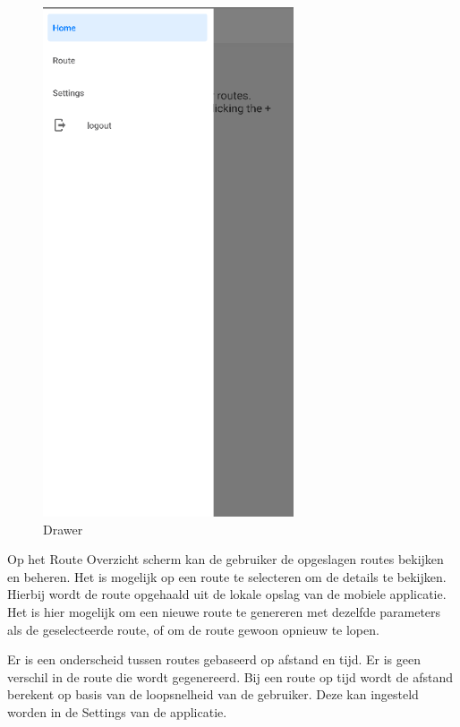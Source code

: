     \begin{figure}[htbp]
        \includegraphics[width=20em]{./graphics/drawer.png}
        \centering
        \caption{Drawer}
        \label{fig:drawer}
    \end{figure}

    Op het Route Overzicht scherm kan de gebruiker de opgeslagen routes bekijken en beheren. Het is mogelijk op een route te selecteren om de details te bekijken. Hierbij wordt de route opgehaald uit de lokale opslag van de mobiele applicatie. Het is hier mogelijk om een nieuwe route te genereren met dezelfde parameters als de geselecteerde route, of om de route gewoon opnieuw te lopen.

    Er is een onderscheid tussen routes gebaseerd op afstand en tijd. Er is geen verschil in de route die wordt gegenereerd. Bij een route op tijd wordt de afstand berekent op basis van de loopsnelheid van de gebruiker. Deze kan ingesteld worden in de Settings van de applicatie.

